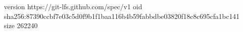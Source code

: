 version https://git-lfs.github.com/spec/v1
oid sha256:87390ccbf7e03c5d0f9b1f1baa116b4b59fabbdbe03820f18c8c695cfa1bc141
size 262240
